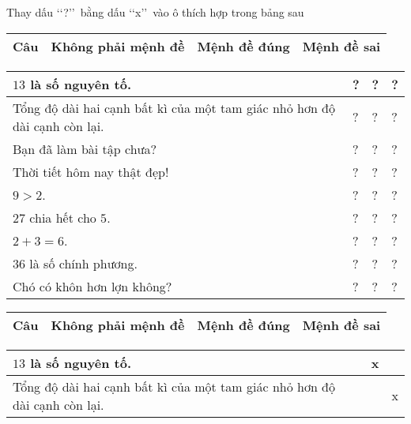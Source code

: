 \begin{vd}%
	Thay dấu \lq\lq?\rq\rq\ bằng dấu \lq\lq x\rq\rq\ vào ô thích hợp trong bảng sau
	\begin{center}
		\begin{tabular}{|>{\centering\arraybackslash}m{5.5cm}|>{\centering\arraybackslash}m{2cm}|>{\centering\arraybackslash}m{2cm}|>{\centering\arraybackslash}m{2cm}|}
			\hline
			Câu & Không phải mệnh đề & Mệnh đề đúng & Mệnh đề sai \\
			\hline
		\end{tabular}
		\begin{tabular}{|>{\raggedright\arraybackslash}m{5.5cm}|>{\centering\arraybackslash}m{2cm}|>{\centering\arraybackslash}m{2cm}|>{\centering\arraybackslash}m{2cm}|}
			$13$ là số nguyên tố. & ? & ? & ? \\
			\hline
			Tổng độ dài hai cạnh bất kì của một tam giác nhỏ hơn độ dài cạnh còn lại. & ? & ? & ? \\
			\hline
			Bạn đã làm bài tập chưa? & ? & ? & ? \\
			\hline
			Thời tiết hôm nay thật đẹp! & ? & ? & ? \\
			\hline
			$9>2$. & ? & ? & ? \\
			\hline
			$27$ chia hết cho $5$. & ? & ? & ? \\
			\hline
			$2+3=6$. & ? & ? & ? \\
			\hline
			$36$ là số chính phương. & ? & ? & ? \\
			\hline
			Chó có khôn hơn lợn không? & ? & ? & ? \\
			\hline
		\end{tabular}
	\end{center}
	\loigiai
	{
		\begin{center}
			\begin{tabular}{|>{\centering\arraybackslash}m{5.5cm}|>{\centering\arraybackslash}m{2cm}|>{\centering\arraybackslash}m{2cm}|>{\centering\arraybackslash}m{2cm}|}
				\hline
				Câu & Không phải mệnh đề & Mệnh đề đúng & Mệnh đề sai \\
				\hline
			\end{tabular}
			\begin{tabular}{|>{\raggedright\arraybackslash}m{5.5cm}|>{\centering\arraybackslash}m{2cm}|>{\centering\arraybackslash}m{2cm}|>{\centering\arraybackslash}m{2cm}|}
				$13$ là số nguyên tố. &  & x &  \\
				\hline
				Tổng độ dài hai cạnh bất kì của một tam giác nhỏ hơn độ dài cạnh còn lại. &  &  & x \\

\end{tabular}
\end{center}}
\end{vd}
